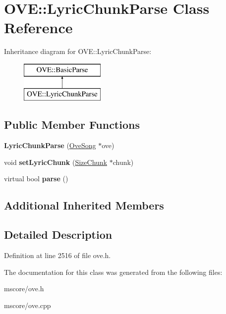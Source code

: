\hypertarget{class_o_v_e_1_1_lyric_chunk_parse}{}\section{O\+VE\+:\+:Lyric\+Chunk\+Parse Class Reference}
\label{class_o_v_e_1_1_lyric_chunk_parse}
Inheritance diagram for O\+VE\+:\+:Lyric\+Chunk\+Parse\+:\begin{figure}[H]
\begin{center}
\leavevmode
\includegraphics[height=2.000000cm]{class_o_v_e_1_1_lyric_chunk_parse}
\end{center}
\end{figure}
\subsection*{Public Member Functions}
\begin{DoxyCompactItemize}
\item 
\mbox{\label{class_o_v_e_1_1_lyric_chunk_parse_a2cce1e2140e094bcbcdcffc77e1234d5}} 
{\bfseries Lyric\+Chunk\+Parse} (\hyperlink{class_o_v_e_1_1_ove_song}{Ove\+Song} $\ast$ove)
\item 
\mbox{\label{class_o_v_e_1_1_lyric_chunk_parse_a0633e3b288d2de802faba6481baadd67}} 
void {\bfseries set\+Lyric\+Chunk} (\hyperlink{class_o_v_e_1_1_size_chunk}{Size\+Chunk} $\ast$chunk)
\item 
\mbox{\label{class_o_v_e_1_1_lyric_chunk_parse_aceb34f2be5a04dc127cf8afa8a2d7668}} 
virtual bool {\bfseries parse} ()
\end{DoxyCompactItemize}
\subsection*{Additional Inherited Members}


\subsection{Detailed Description}


Definition at line 2516 of file ove.\+h.



The documentation for this class was generated from the following files\+:\begin{DoxyCompactItemize}
\item 
mscore/ove.\+h\item 
mscore/ove.\+cpp\end{DoxyCompactItemize}
